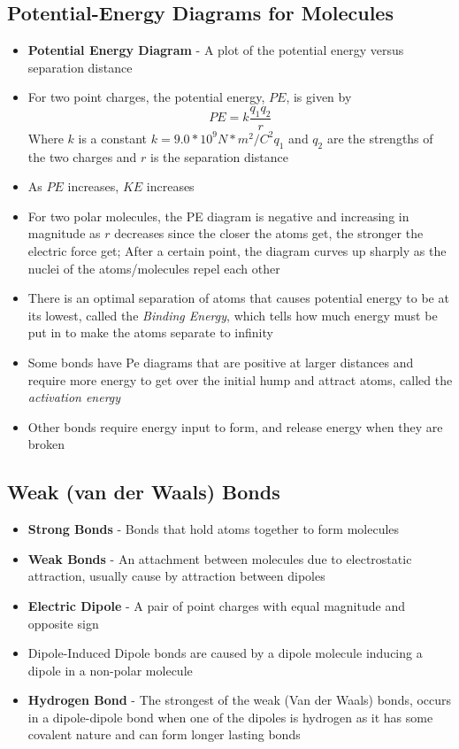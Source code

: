 \subsection{Potential-Energy Diagrams for Molecules}
\begin{itemize}
    \item \textbf{Potential Energy Diagram} - A plot of the potential energy versus separation distance
    \item For two point charges, the potential energy, \(PE\), is given by \[PE=k\frac{q_1q_2}{r}\] Where \(k\) is a constant \(k=9.0*10^9N*m^2/C^2\)\(q_1\) and \(q_2\) are the strengths of the two charges and \(r\) is the separation distance
    \item As \(PE\) increases, \(KE\) increases
    \item For two polar molecules, the PE diagram is negative and increasing in magnitude as \(r\) decreases since the closer the atoms get, the stronger the electric force get; After a certain point, the diagram curves up sharply as the nuclei of the atoms/molecules repel each other 
    \item There is an optimal separation of atoms that causes potential energy to be at its lowest, called the \emph{Binding Energy}, which tells how much energy must be put in to make the atoms separate to infinity
    \item Some bonds have Pe diagrams that are positive at larger distances and require more energy to get over the initial hump and attract atoms, called the \emph{activation energy}
    \item Other bonds require energy input to form, and release energy when they are broken 
\end{itemize}

\subsection{Weak (van der Waals) Bonds}
\begin{itemize}
    \item \textbf{Strong Bonds} - Bonds that hold atoms together to form molecules
    \item \textbf{Weak Bonds} - An attachment between molecules due to electrostatic attraction, usually cause by attraction between dipoles
    \item \textbf{Electric Dipole} - A pair of point charges with equal magnitude and opposite sign
    \item Dipole-Induced Dipole bonds are caused by a dipole molecule inducing a dipole in a non-polar molecule
    \item \textbf{Hydrogen Bond} - The strongest of the weak (Van der Waals) bonds, occurs in a dipole-dipole bond when one of the dipoles is hydrogen as it has some covalent nature and can form longer lasting bonds
\end{itemize}


